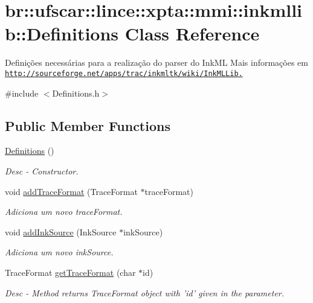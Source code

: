 \hypertarget{classbr_1_1ufscar_1_1lince_1_1xpta_1_1mmi_1_1inkmllib_1_1Definitions}{
\section{br::ufscar::lince::xpta::mmi::inkmllib::Definitions Class Reference}
\label{classbr_1_1ufscar_1_1lince_1_1xpta_1_1mmi_1_1inkmllib_1_1Definitions}
}


Definições necessárias para a realização do parser do InkML Mais informações em \href{http://sourceforge.net/apps/trac/inkmltk/wiki/InkMLLib.}{\tt http://sourceforge.net/apps/trac/inkmltk/wiki/InkMLLib.}  




{\ttfamily \#include $<$Definitions.h$>$}

\subsection*{Public Member Functions}
\begin{DoxyCompactItemize}
\item 
\hyperlink{classbr_1_1ufscar_1_1lince_1_1xpta_1_1mmi_1_1inkmllib_1_1Definitions_ad775a5baa40c2c83fe2f88ff61ada0ff}{Definitions} ()
\begin{DoxyCompactList}\small\item\em Desc -\/ Constructor. \item\end{DoxyCompactList}\item 
void \hyperlink{classbr_1_1ufscar_1_1lince_1_1xpta_1_1mmi_1_1inkmllib_1_1Definitions_afb1a42b76226bfb4e7bfb57d3a7d814f}{addTraceFormat} (TraceFormat $\ast$traceFormat)
\begin{DoxyCompactList}\small\item\em Adiciona um novo traceFormat. \item\end{DoxyCompactList}\item 
void \hyperlink{classbr_1_1ufscar_1_1lince_1_1xpta_1_1mmi_1_1inkmllib_1_1Definitions_a9121bec3de8b82278e614a2c021c5462}{addInkSource} (InkSource $\ast$inkSource)
\begin{DoxyCompactList}\small\item\em Adiciona um novo inkSource. \item\end{DoxyCompactList}\item 
TraceFormat \hyperlink{classbr_1_1ufscar_1_1lince_1_1xpta_1_1mmi_1_1inkmllib_1_1Definitions_a76515ede42233e9cbbf922c298a7d082}{getTraceFormat} (char $\ast$id)
\begin{DoxyCompactList}\small\item\em Desc -\/ Method returns TraceFormat object with 'id' given in the parameter. \item\end{DoxyCompactList}\end{DoxyCompactItemize}


